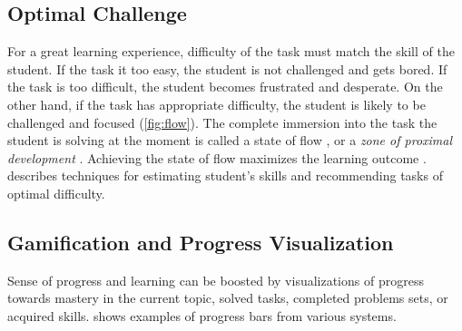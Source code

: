 \subsection{Optimal Challenge}  %
\label{sec:motivation.challenge}
For a great learning experience,
  difficulty of the task must match the skill of the student.
If the task it too easy,
  the student is not challenged and gets bored.
If the task is too difficult,
  the student becomes frustrated and desperate.
On the other hand, if the task has appropriate difficulty,
  the student is likely to be challenged and focused
  (\cref{fig:flow}).
The complete immersion into the task the student is solving at the moment is called
  a state of flow \cite{flow},
  or a \emph{zone of proximal development} \cite{zone-of-proximal-development}.
Achieving the state of flow maximizes the learning outcome \cite{adaptive-practice}.
 describes techniques for estimating student's skills
and recommending tasks of optimal difficulty.


\subsection{Gamification and Progress Visualization}

Sense of progress and learning can be boosted by visualizations of
progress towards mastery in the current topic, solved tasks, completed problems sets,
or acquired skills.
 shows examples of progress bars from various systems.


